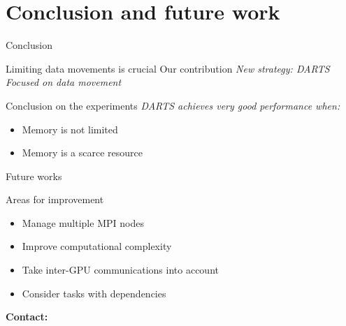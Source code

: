 \documentclass{libs/ufc_format}
\begin{document}
\section{Conclusion and future work}
\begin{frame}{Conclusion}
\begin{block}{Limiting data movements is crucial}
	Our contribution \MVRightarrow{}
	\emph{New strategy: DARTS}
	\emph{Focused on data movement}
\end{block}
\begin{exampleblock}{Conclusion on the experiments}
	\emph{DARTS achieves very good performance when:}
		\begin{itemize}
			\item Memory is not limited
			\item Memory is a scarce resource
		\end{itemize}
\end{exampleblock}
\end{frame}

\begin{frame}{Future works}
		
	\begin{exampleblock}{Areas for improvement}
		\begin{itemize}
		\item Manage multiple MPI nodes
		\item Improve computational complexity
		\item Take inter-GPU communications into account
		\item Consider tasks with dependencies
		\end{itemize}
	\end{exampleblock}
	\pause
    \centering
    \huge{\textbf{}}
    
    \vspace{1cm}
    
    \large{\textbf{Contact:}}
    \newline
    \vspace*{0.5cm}
    \large{}\\
    \large{}

\end{frame}
\end{document}
